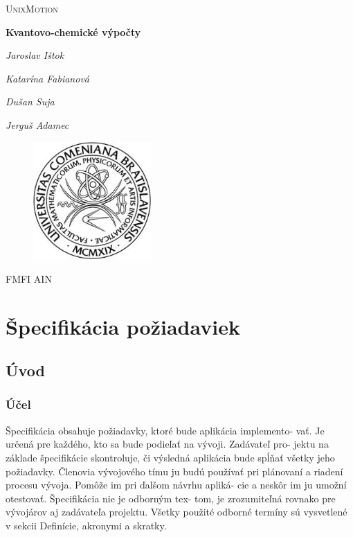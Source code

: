 \documentclass[12pt,a4paper]{article}
\begin{document}
	
\begin{titlepage}
	\centering
	\vspace{1cm}
	{\scshape\LARGE UnixMotion} \par
	\vspace{1cm}
	{\huge\bfseries Kvantovo-chemické výpočty} \par
	\vspace{2cm}
	{\Large\itshape Jaroslav Ištok \par}
	{\Large\itshape Katarína Fabianová \par}
	{\Large\itshape Dušan Suja \par}
	{\Large\itshape Jerguš Adamec \par}
	\vfill
	\begin{figure}[H]
		\centering
		\includegraphics[width=0.4\textwidth]{fmfi}
	\end{figure}
	\vspace{2cm}
	{\large FMFI AIN}
\end{titlepage}

\pagebreak

\tableofcontents
\vspace{2cm}
\listoffigures

\pagebreak

\section{Špecifikácia požiadaviek}

\subsection{Úvod}

\subsubsection{Účel}
Špecifikácia obsahuje požiadavky, ktoré bude aplikácia implemento-
vať. Je určená pre každého, kto sa bude podieľať na vývoji. Zadávateľ pro-
jektu na základe špecifikácie skontroluje, či výsledná aplikácia bude
spĺňať všetky jeho požiadavky. Členovia vývojového tímu ju budú používať
pri plánovaní a riadení procesu vývoja. Pomôže im pri ďalšom návrhu apliká-
cie a neskôr im ju umožní otestovať. Špecifikácia nie je odborným tex-
tom, je zrozumiteľná rovnako pre vývojárov aj zadávateľa projektu. Všetky
použité odborné termíny sú vysvetlené v sekcii Definície, akronymi a skratky.
\end{document}
